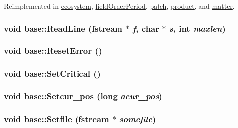 Reimplemented in \hyperlink{classecosystem_a5970455f5f04fa5382ebc534c3149185}{ecosystem}, \hyperlink{classfield_order_period_a125328fd2b2dc16b8183dd32a22cb63e}{fieldOrderPeriod}, \hyperlink{classpatch_aaa485c520a0fb67c68b2a5cfbe12d99e}{patch}, \hyperlink{classproduct_afa55a9466d7f5a287bae17100289733e}{product}, and \hyperlink{classmatter_a7e74962a5eb9280b2a259c9b908ded79}{matter}.\hypertarget{classbase_a25bbc64113a939ec258c996b3000c112}{
\subsubsection[{ReadLine}]{\setlength{\rightskip}{0pt plus 5cm}void base::ReadLine (fstream $\ast$ {\em f}, \/  char $\ast$ {\em s}, \/  int {\em maxlen})}}
\label{classbase_a25bbc64113a939ec258c996b3000c112}
\hypertarget{classbase_af192519b5f92a24a2fdb5d0696fe01b4}{
\subsubsection[{ResetError}]{\setlength{\rightskip}{0pt plus 5cm}void base::ResetError ()}}
\label{classbase_af192519b5f92a24a2fdb5d0696fe01b4}
\hypertarget{classbase_a80052a7eeb8bce90247aedd358cc1cf6}{
\subsubsection[{SetCritical}]{\setlength{\rightskip}{0pt plus 5cm}void base::SetCritical ()}}
\label{classbase_a80052a7eeb8bce90247aedd358cc1cf6}
\hypertarget{classbase_a95e051f408e6a94d4f78fbacbace1363}{
\subsubsection[{Setcur\_\-pos}]{\setlength{\rightskip}{0pt plus 5cm}void base::Setcur\_\-pos (long {\em acur\_\-pos})}}
\label{classbase_a95e051f408e6a94d4f78fbacbace1363}
\hypertarget{classbase_a3cb378050dc4ced8420f41dcd7292239}{
\subsubsection[{Setfile}]{\setlength{\rightskip}{0pt plus 5cm}void base::Setfile (fstream $\ast$ {\em somefile})}}
